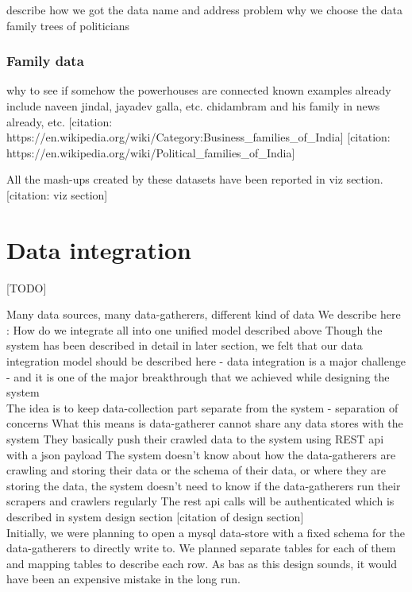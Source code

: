 describe how we got the data
name and address problem
why we choose the data family trees of politicians




\subsubsection{Family data}

why to see if somehow the powerhouses are connected 
known examples already include naveen jindal, jayadev galla, etc.
chidambram and his family in news already, etc.
[citation: https://en.wikipedia.org/wiki/Category:Business\_families\_of\_India]
[citation: https://en.wikipedia.org/wiki/Political\_families\_of\_India]

All the mash-ups created by these datasets have been reported in viz section. [citation: viz section]

\section{Data integration}

[TODO]

Many data sources, many data-gatherers, different kind of data
We describe here : How do we integrate all into one unified model described above
Though the system has been described in detail in later section, we felt that our data integration model should be described here - data integration is a major challenge - and it is one of the major breakthrough that we achieved while designing the system \\

The idea is to keep data-collection part separate from the system - separation of concerns
What this means is data-gatherer cannot share any data stores with the system
They basically push their crawled data to the system using REST api with a json payload
The system doesn't know about how the data-gatherers are crawling and storing their data or the schema of their data, or where they are storing the data,  the system doesn't need to know if the data-gatherers run their scrapers and crawlers regularly
The rest api calls will be authenticated which is described in system design section [citation of design section] \\

Initially, we were planning to open a mysql data-store with a fixed schema for the data-gatherers to directly write to. We planned separate tables for each of them and mapping tables to describe each row. As bas as this design sounds, it would have been an expensive mistake in the long run. \\

